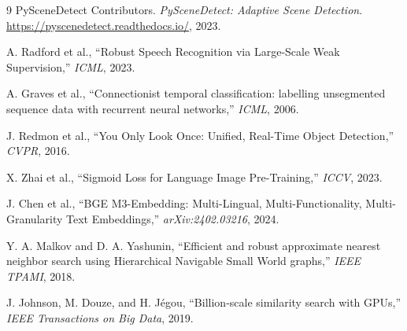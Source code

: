\documentclass[11pt,a4paper]{article}
\begin{document}
\begin{thebibliography}{9}
PySceneDetect Contributors. \textit{PySceneDetect: Adaptive Scene Detection}. \url{https://pyscenedetect.readthedocs.io/}, 2023.

A. Radford et al., ``Robust Speech Recognition via Large-Scale Weak Supervision,'' \textit{ICML}, 2023.

A. Graves et al., ``Connectionist temporal classification: labelling unsegmented sequence data with recurrent neural networks,'' \textit{ICML}, 2006.

J. Redmon et al., ``You Only Look Once: Unified, Real-Time Object Detection,'' \textit{CVPR}, 2016.

X. Zhai et al., ``Sigmoid Loss for Language Image Pre-Training,'' \textit{ICCV}, 2023.

J. Chen et al., ``BGE M3-Embedding: Multi-Lingual, Multi-Functionality, Multi-Granularity Text Embeddings,'' \textit{arXiv:2402.03216}, 2024.

Y. A. Malkov and D. A. Yashunin, ``Efficient and robust approximate nearest neighbor search using Hierarchical Navigable Small World graphs,'' \textit{IEEE TPAMI}, 2018.

J. Johnson, M. Douze, and H. Jégou, ``Billion-scale similarity search with GPUs,'' \textit{IEEE Transactions on Big Data}, 2019.
\end{thebibliography}
\end{document}
